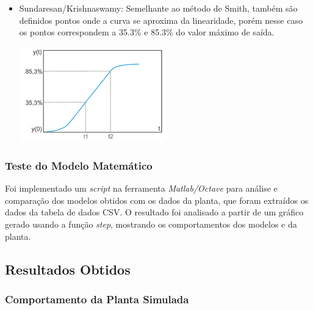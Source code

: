\documentclass[
	article,			%
	11pt,				%
	oneside,			%
	a4paper,			%
	section=TITLE,		%
	english,			%
	brazil,				%
	sumario=tradicional
	]{abntex2}
\begin{document}
\begin{itemize}
    \item Sundaresan/Krishnaswamy: Semelhante ao método de Smith, também são definidos pontos onde a curva se aproxima da linearidade, porém nesse caso os pontos correspondem a 35.3\% e 85.3\% do valor máximo de saída.
    
    \begin{minipage}{\linewidth}
        \centering
        \includegraphics[width=0.5\textwidth]{img/ex-sundaresan.png}
        \label{fig:ex-sund}
    \end{minipage}
    
\end{itemize}


\subsubsection{Teste do Modelo Matemático}

Foi implementado um \textit{script} na ferramenta \textit{Matlab/Octave} para análise e comparação dos modelos obtidos com os dados da planta, que foram extraídos os dados da tabela de dados CSV. O resultado foi analisado a partir de um gráfico gerado usando a função \textit{step}, mostrando os comportamentos dos modelos e da planta.

\newpage
\subsection{Resultados Obtidos}
\subsubsection{Comportamento da Planta Simulada}
\end{document}
